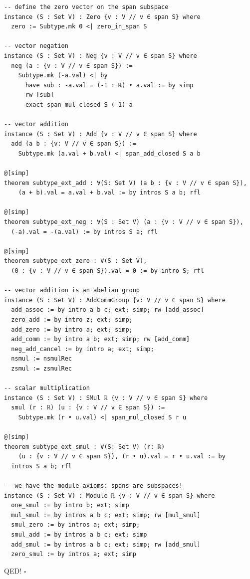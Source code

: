 \documentclass{article}
\begin{document}
\begin{lstlisting}
-- define the zero vector on the span subspace
instance (S : Set V) : Zero {v : V // v ∈ span S} where
  zero := Subtype.mk 0 <| zero_in_span S

-- vector negation
instance (S : Set V) : Neg {v : V // v ∈ span S} where
  neg (a : {v : V // v ∈ span S}) :=
    Subtype.mk (-a.val) <| by
      have sub : -a.val = (-1 : ℝ) • a.val := by simp
      rw [sub]
      exact span_mul_closed S (-1) a

-- vector addition
instance (S : Set V) : Add {v : V // v ∈ span S} where
  add (a b : {v: V // v ∈ span S}) :=
    Subtype.mk (a.val + b.val) <| span_add_closed S a b

@[simp]
theorem subtype_ext_add : ∀(S: Set V) (a b : {v : V // v ∈ span S}),
    (a + b).val = a.val + b.val := by intros S a b; rfl

@[simp]
theorem subtype_ext_neg : ∀(S : Set V) (a : {v : V // v ∈ span S}),
  (-a).val = -(a.val) := by intros S a; rfl

@[simp]
theorem subtype_ext_zero : ∀(S : Set V),
  (0 : {v : V // v ∈ span S}).val = 0 := by intro S; rfl

-- vector addition is an abelian group
instance (S : Set V) : AddCommGroup {v: V // v ∈ span S} where
  add_assoc := by intro a b c; ext; simp; rw [add_assoc]
  zero_add := by intro z; ext; simp;
  add_zero := by intro a; ext; simp;
  add_comm := by intro a b; ext; simp; rw [add_comm]
  neg_add_cancel := by intro a; ext; simp;
  nsmul := nsmulRec
  zsmul := zsmulRec

-- scalar multiplication
instance (S : Set V) : SMul ℝ {v : V // v ∈ span S} where
  smul (r : ℝ) (u : {v : V // v ∈ span S}) :=
    Subtype.mk (r • u.val) <| span_mul_closed S r u

@[simp]
theorem subtype_ext_smul : ∀(S: Set V) (r: ℝ)
    (u : {v : V // v ∈ span S}), (r • u).val = r • u.val := by
  intros S a b; rfl

-- we have the module axioms: spans are subspaces!
instance (S : Set V) : Module ℝ {v : V // v ∈ span S} where
  one_smul := by intro b; ext; simp
  mul_smul := by intros a b c; ext; simp; rw [mul_smul]
  smul_zero := by intros a; ext; simp;
  smul_add := by intros a b c; ext; simp
  add_smul := by intros a b c; ext; simp; rw [add_smul]
  zero_smul := by intros a; ext; simp
\end{lstlisting}

QED! $\square$


\onecolumn
\newpage{}
\end{document}
